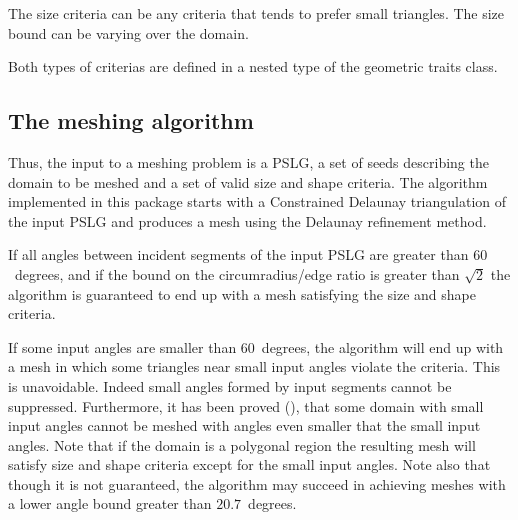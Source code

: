 {%

 The size criteria can be any criteria that
tends to prefer small triangles.
The size bound  can be varying over the domain. 

Both types of criterias are defined
in a nested type  of the geometric traits class.


\subsection{The meshing algorithm}

Thus, the input to a  meshing problem is 
a PSLG,
a set of seeds describing the domain to be meshed
and  a set of valid size and shape criteria. 
The algorithm implemented in this package
starts with a Constrained Delaunay triangulation 
of the input PSLG  and
produces a mesh
using the Delaunay refinement method.

If all angles between incident segments of the input PSLG
are greater than $60$~degrees, and if the bound on the
circumradius/edge ratio is greater than $\sqrt{2}$
the algorithm is guaranteed to end up with a mesh
satisfying the size and shape criteria.

If some input 
angles are smaller than $60$~degrees, the algorithm
will end up with a mesh in which some triangles 
near small input angles violate the  criteria.
This is unavoidable. Indeed  small angles formed by input segments
cannot be suppressed. Furthermore, 
it  has been proved (\cite{s-mgdsa-00}),
that some domain  with small input angles
cannot be meshed with angles even smaller that the small input
angles.
Note that if the domain is a polygonal region
the resulting mesh will satisfy size and shape criteria
except for the small input angles.
Note also that though it is not guaranteed, the algorithm may succeed 
in achieving meshes with a lower angle bound
greater than $20.7$~degrees.





}
